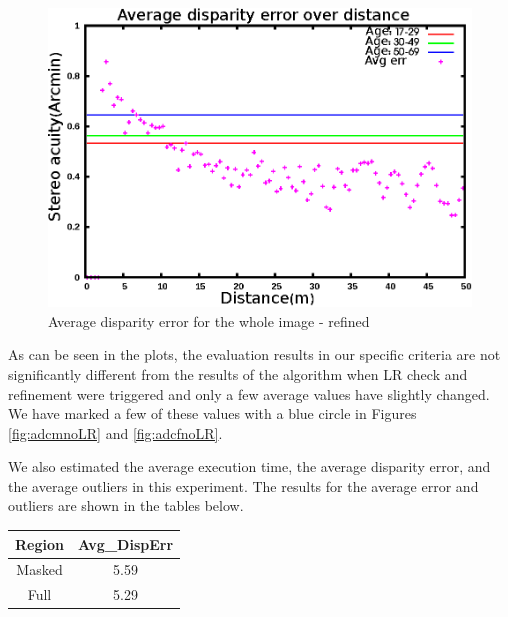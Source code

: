 \begin{figure}[H]
\centering
\includegraphics[scale=0.8]{adcenfull3}
\caption{Average disparity error for the whole image - refined}
\label{fig:adcf3}
\end{figure} 

As can be seen in the plots, the evaluation results in our specific criteria 
are not significantly different from the results of the algorithm when LR check and refinement were triggered
and only a few average values have slightly changed. We have marked a few of these values with a blue circle in Figures \ref{fig:adcmnoLR} and \ref{fig:adcfnoLR}.

We also estimated the average execution time, the average disparity error, and the average outliers in this experiment. The results for 
the average error and outliers are shown in the tables below.

\begin{minipage}{0.8\linewidth}
\begin{center}
\label{tab:adcerrNref}
\begin{tabular}{|c|c|}
\hline
Region & Avg\_DispErr \\ \hline
Masked & 5.59 \\  \hline
Full & 5.29 \\ \hline
\end{tabular}
\end{center}
\end{minipage} \newline

